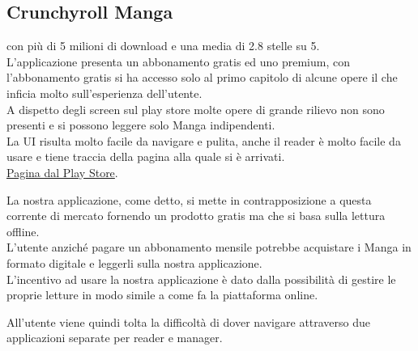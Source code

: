 \documentclass[../Assignment-3-LPSMT.tex]{subfiles}
\begin{document}
\begin{itemize}
	      \section{Crunchyroll Manga} con più di 5 milioni di download e una media di 2.8 stelle su 5.\\
	      L'applicazione presenta un abbonamento gratis ed uno premium, con l'abbonamento gratis si ha accesso solo al primo capitolo di alcune opere il che inficia molto sull'esperienza dell'utente.\\
	      A dispetto degli screen sul play store molte opere di grande rilievo non sono presenti e si possono leggere solo Manga indipendenti.\\
	      La UI risulta molto facile da navigare e pulita, anche il reader è molto facile da usare e tiene traccia della pagina alla quale si è arrivati.\\
	     \href{https://play.google.com/store/apps/details?id=com.crunchyroll.crmanga}{Pagina dal Play Store}.
\end{itemize}

La nostra applicazione, come detto, si mette in contrapposizione a
questa corrente di mercato fornendo un prodotto gratis ma che si basa
sulla lettura offline.\\
L'utente anziché pagare un abbonamento mensile potrebbe acquistare i
Manga in formato digitale e leggerli sulla nostra applicazione.\\
L'incentivo ad usare la nostra applicazione è dato dalla possibilità di
gestire le proprie letture in modo simile a come fa la piattaforma
online.

All'utente viene quindi tolta la difficoltà di dover navigare attraverso
due applicazioni separate per reader e manager.
\end{document}

